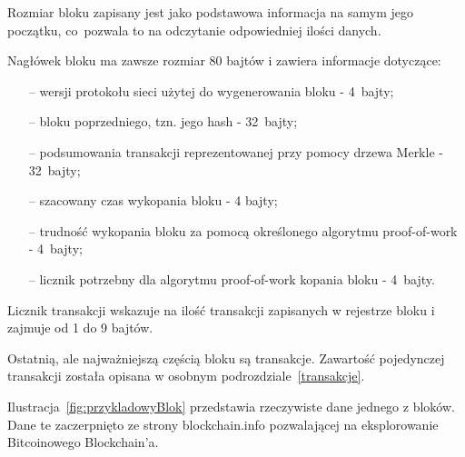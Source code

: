 \documentclass[12pt, twoside, final, openany]{mgr}
\begin{document}
\indent Rozmiar bloku zapisany jest jako podstawowa informacja na samym jego początku, co~pozwala to na odczytanie odpowiedniej ilości danych. 

\indent Nagłówek bloku ma zawsze rozmiar 80 bajtów i zawiera informacje dotyczące:
\begin{itemize}
\item[--] wersji protokołu sieci użytej do wygenerowania bloku - 4~bajty;
\item[--] bloku poprzedniego, tzn. jego hash - 32~bajty;
\item[--] podsumowania transakcji reprezentowanej przy pomocy drzewa Merkle - 32~bajty;
\item[--] szacowany czas wykopania bloku - 4 bajty;
\item[--] trudność wykopania bloku za pomocą określonego algorytmu proof-of-work - 4~bajty;
\item[--] licznik potrzebny dla algorytmu proof-of-work kopania bloku - 4~bajty.
\end{itemize} 

\indent Licznik transakcji wskazuje na ilość transakcji zapisanych w rejestrze bloku i zajmuje od 1 do 9 bajtów.

\indent Ostatnią, ale najważniejszą częścią bloku są transakcje. Zawartość pojedynczej transakcji została opisana w osobnym podrozdziale~\ref{transakcje}.

\indent Ilustracja~\ref{fig:przykladowyBlok} przedstawia rzeczywiste dane jednego z bloków. Dane te zaczerpnięto ze strony blockchain.info pozwalającej na eksplorowanie Bitcoinowego Blockchain'a\cite{blockchaininfo}.
\end{document}
